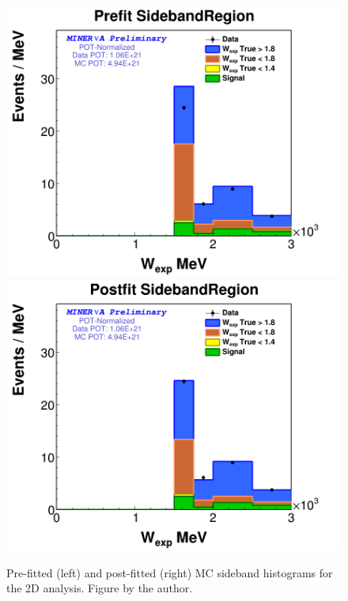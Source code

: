 \begin{figure}
    \centering
    \includegraphics[scale=0.2]{Figures/Chapter4/BGStudies/PreWFit_wexp_fit_1PiTracked_PN_SidebandRegion.png}
    \includegraphics[scale=0.2]{Figures/Chapter4/BGStudies/PostWFit_wexp_fit_1PiTracked_PN_SidebandRegion.png}
    \caption{Pre-fitted (left) and post-fitted (right) MC sideband histograms for the 2D analysis. Figure by the author.}
    \label{fig:BgStudies:SidebandTunning:PrePosFit1DAnalysis2Danalysis}
\end{figure}

\pagebreak


